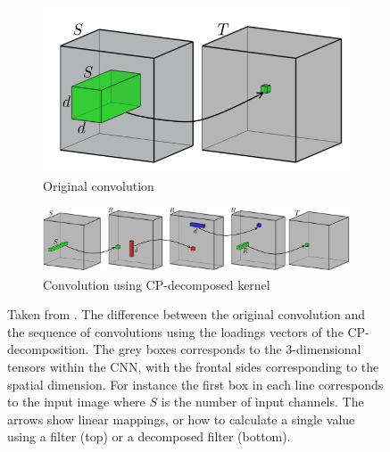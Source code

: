 \begin{figure}
    \centering
    \begin{subfigure}{\linewidth}
        \centering
        \includegraphics[width=0.4\linewidth]{Pics/03_Previous_work/fullConv.png}
        \caption{Original convolution}
    \end{subfigure}
    \begin{subfigure}{\linewidth}
        \centering
        \includegraphics[width=\linewidth]{Pics/03_Previous_work/decompConv.png}
        \caption{Convolution using CP-decomposed kernel}
    \end{subfigure}
    \captionsetup{width=.95\linewidth}
    \caption{Taken from \cite{Lebedev2015}. The difference between the original convolution and the sequence of convolutions using the loadings vectors of the CP-decomposition. The grey boxes corresponds to the 3-dimensional tensors within the CNN, with the frontal sides corresponding to the spatial dimension. For instance the first box in each line corresponds to the input image where $S$ is the number of input channels. The arrows show linear mappings, or how to calculate a single value using a filter (top) or a decomposed filter (bottom).}
    \label{fig:decompConvDifference}
\end{figure}

